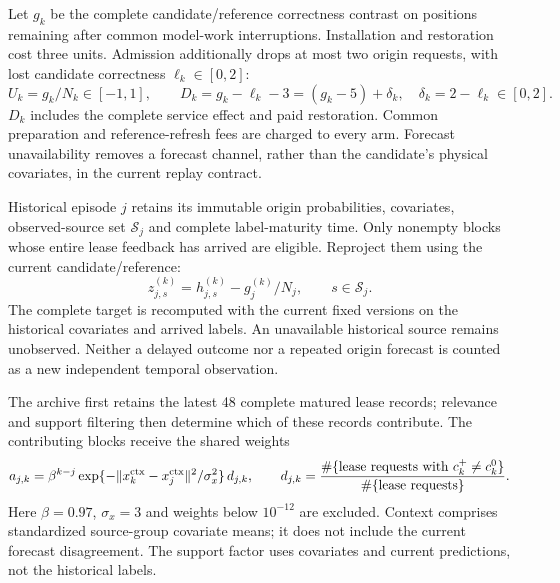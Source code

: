\documentclass[10pt]{article}
\begin{document}
Let $g_k$ be the complete candidate/reference correctness contrast on
positions remaining after common model-work interruptions. Installation
and restoration cost three units. Admission additionally drops at most
two origin requests, with lost candidate correctness $\ell_k\in[0,2]$:
\begin{equation}
 U_k=g_k/N_k\in[-1,1],\qquad
 D_k=g_k-\ell_k-3=(g_k-5)+\delta_k,\quad
 \delta_k=2-\ell_k\in[0,2].
 \label{eq:complete-lease-return}
\end{equation}
$D_k$ includes the complete service effect and paid restoration.
Common preparation and reference-refresh fees are charged to every arm.
Forecast unavailability removes a forecast channel, rather than the
candidate's physical covariates, in the current replay contract.

Historical episode $j$ retains its immutable origin probabilities,
covariates, observed-source set $\mathcal S_j$ and complete label-maturity
time. Only nonempty blocks whose entire lease feedback has arrived are
eligible. Reproject them using the current candidate/reference:
\begin{equation}
 z_{j,s}^{(k)}=h_{j,s}^{(k)}-g_j^{(k)}/N_j,
 \qquad s\in\mathcal S_j.
 \label{eq:complete-joint-error}
\end{equation}
The complete target is recomputed with the current fixed versions on the
historical covariates and arrived labels. An unavailable historical source
remains unobserved. Neither a delayed outcome nor a repeated origin
forecast is counted as a new independent temporal observation.

The archive first retains the latest 48 complete matured lease records;
relevance and support filtering then determine which of these records
contribute. The contributing blocks receive the shared weights
\begin{equation}
 a_{j,k}=\beta^{k-j}
 \exp\{-\|x_k^{\rm ctx}-x_j^{\rm ctx}\|^2/\sigma_x^2\}\,d_{j,k},
 \qquad
 d_{j,k}=\frac{\#\{\text{lease requests with }c_k^+\ne c_k^0\}}
 {\#\{\text{lease requests}\}}.
 \label{eq:supported-history-kernel}
\end{equation}
Here $\beta=0.97$, $\sigma_x=3$ and weights below $10^{-12}$ are
excluded. Context comprises standardized source-group covariate means;
it does not include the current forecast disagreement. The support factor
uses covariates and current predictions, not the historical labels.
\end{document}
